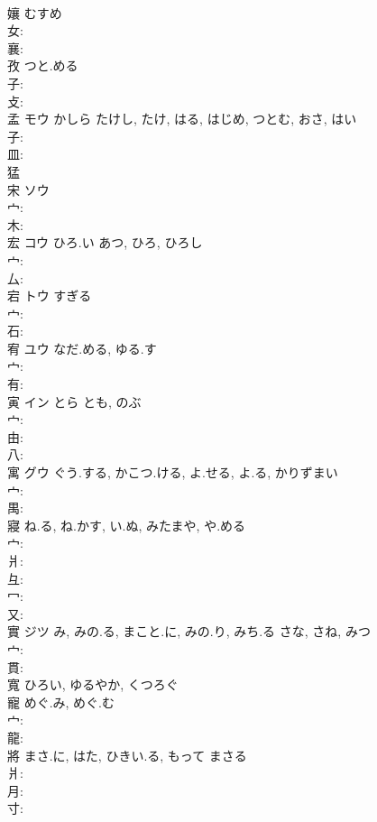 \documentclass[8pt]{extreport}
\begin{document}
\begin{CJK}{UTF8}{min}
\\	孃		むすめ				
\\	女: 
\\	襄: 
\\	孜		つと.める				
\\	子: 
\\	攴: 
\\	孟	モウ	かしら	たけし, たけ, はる, はじめ, つとむ, おさ, はい	
\\	子: 
\\	皿: 
\\	猛 
\\	宋	ソウ			
\\	宀: 
\\	木: 
\\	宏	コウ	ひろ.い	あつ, ひろ, ひろし	
\\	宀: 
\\	厶: 
\\	宕	トウ	すぎる		
\\	宀: 
\\	石: 
\\	宥	ユウ	なだ.める, ゆる.す		
\\	宀: 
\\	有: 
\\	寅	イン	とら	とも, のぶ	
\\	宀: 
\\	由: 
\\	八: 
\\	寓	グウ	ぐう.する, かこつ.ける, よ.せる, よ.る, かりずまい		
\\	宀: 
\\	禺: 
\\	寢		ね.る, ね.かす, い.ぬ, みたまや, や.める				
\\	宀: 
\\	爿: 
\\	彑: 
\\	冖: 
\\	又: 
\\	實	ジツ	み, みの.る, まこと.に, みの.り, みち.る	さな, さね, みつ	
\\	宀: 
\\	貫: 
\\	寬		ひろい, ゆるやか, くつろぐ				
\\	寵		めぐ.み, めぐ.む				
\\	宀: 
\\	龍: 
\\	將		まさ.に, はた, ひきい.る, もって	まさる			
\\	爿: 
\\	月: 
\\	寸: 

\end{CJK}
\end{document}
